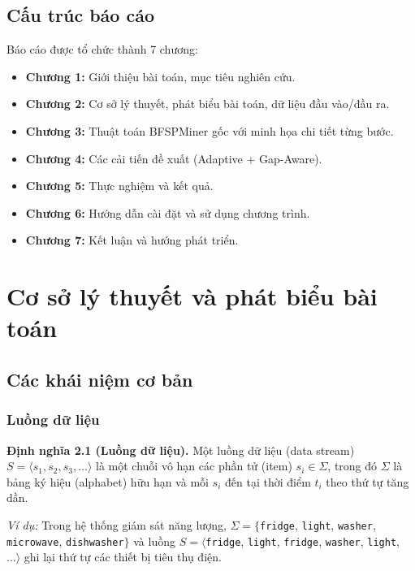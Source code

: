 \documentclass[a4paper,12pt]{report}
\begin{document}
\section{Cấu trúc báo cáo}
Báo cáo được tổ chức thành 7 chương:
\begin{itemize}
    \item \textbf{Chương 1:} Giới thiệu bài toán, mục tiêu nghiên cứu.
    \item \textbf{Chương 2:} Cơ sở lý thuyết, phát biểu bài toán, dữ liệu đầu vào/đầu ra.
    \item \textbf{Chương 3:} Thuật toán BFSPMiner gốc với minh họa chi tiết từng bước.
    \item \textbf{Chương 4:} Các cải tiến đề xuất (Adaptive + Gap-Aware).
    \item \textbf{Chương 5:} Thực nghiệm và kết quả.
    \item \textbf{Chương 6:} Hướng dẫn cài đặt và sử dụng chương trình.
    \item \textbf{Chương 7:} Kết luận và hướng phát triển.
\end{itemize}

\chapter{Cơ sở lý thuyết và phát biểu bài toán}
\label{chap:theory}

\section{Các khái niệm cơ bản}

\subsection{Luồng dữ liệu}
\textbf{Định nghĩa 2.1 (Luồng dữ liệu).} Một luồng dữ liệu (data stream) $S = \langle s_1, s_2, s_3, \dots \rangle$ là một chuỗi vô hạn các phần tử (item) $s_i \in \Sigma$, trong đó $\Sigma$ là bảng ký hiệu (alphabet) hữu hạn và mỗi $s_i$ đến tại thời điểm $t_i$ theo thứ tự tăng dần.

\textit{Ví dụ:} Trong hệ thống giám sát năng lượng, $\Sigma = \{$\texttt{fridge}, \texttt{light}, \texttt{washer}, \texttt{microwave}, \texttt{dishwasher}$\}$ và luồng $S = \langle$\texttt{fridge}, \texttt{light}, \texttt{fridge}, \texttt{washer}, \texttt{light}, $\dots\rangle$ ghi lại thứ tự các thiết bị tiêu thụ điện.
\end{document}
